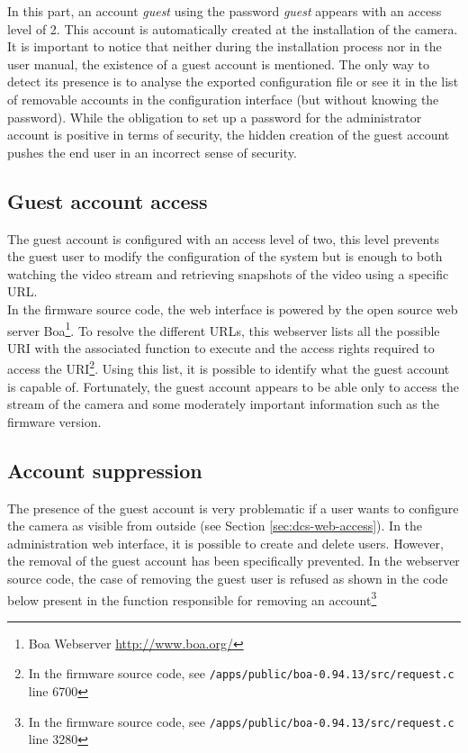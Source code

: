 In this part, an account \emph{guest} using the password \emph{guest} appears with an access level of 2.
This account is automatically created at the installation of the camera.\\

It is important to notice that neither during the installation process nor in the user manual, the existence of a guest account is mentioned.
The only way to detect its presence is to analyse the exported configuration file or see it in the list of removable accounts in the configuration interface (but without knowing the password).
While the obligation to set up a password for the administrator account is positive in terms of security, the hidden creation of the guest account pushes the end user in an incorrect sense of security.

\subsection{Guest account access}
\label{sec:dcs-guest-rights}

The guest account is configured with an access level of two, this level prevents the guest user to modify the configuration of the system but is enough to both watching the video stream and retrieving snapshots of the video using a specific URL.\\

In the firmware source code, the web interface is powered by the open source web server Boa\footnote{Boa Webserver \url{http://www.boa.org/}}.
To resolve the different URLs, this webserver lists all the possible URI with the associated function to execute and the access rights required to access the URI\footnote{In the firmware source code, see \texttt{/apps/public/boa-0.94.13/src/request.c} line 6700}.
Using this list, it is possible to identify what the guest account is capable of.
Fortunately, the guest account appears to be able only to access the stream of the camera and some moderately important information such as the firmware version.

\subsection{Account suppression}
\label{sec:dcs-guest-suppression}

The presence of the guest account is very problematic if a user wants to configure the camera as visible from outside (see Section \ref{sec:dcs-web-access}).
In the administration web interface, it is possible to create and delete users.
However, the removal of the guest account has been specifically prevented.
In the webserver source code, the case of removing the guest user is refused as shown in the code below present in the function responsible for removing an account\footnote{In the firmware source code, see \texttt{/apps/public/boa-0.94.13/src/request.c} line 3280}


